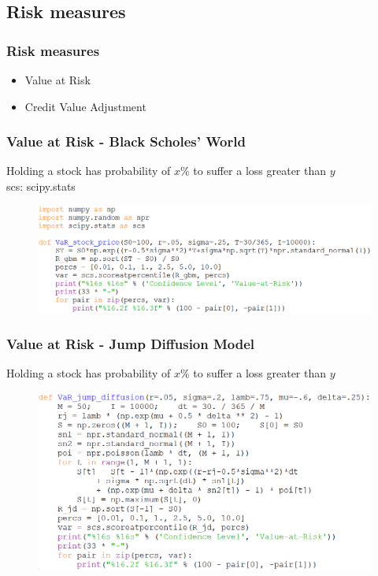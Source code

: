 \documentclass{beamer}
\begin{document}
\subsection{Risk measures}
\begin{frame}
\frametitle{Risk measures}
\begin{itemize}
	\item Value at Risk
	\item Credit Value Adjustment
\end{itemize}
\end{frame}

\begin{frame}
\frametitle{Value at Risk - Black Scholes' World}
\begin{center}
Holding a stock has probability of $x$\% to suffer a loss greater than $y$\\[3mm]
scs: scipy.stats
\end{center}
\begin{figure}[H]
	\includegraphics[scale=0.42]{VaR_stock_price.png}
\end{figure}
\end{frame}

\begin{frame}
\frametitle{Value at Risk - Jump Diffusion Model}
\begin{center}
Holding a stock has probability of $x$\% to suffer a loss greater than $y$
\end{center}
\begin{figure}[H]
	\includegraphics[scale=0.42]{VaR_jump_diffusion.png}
\end{figure}
\end{frame}
\end{document}
